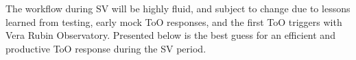 The workflow during SV will be highly fluid, and subject to change due to lessons learned from testing, early mock ToO responses, and the first ToO triggers with Vera Rubin Observatory. Presented below is the best guess for an efficient and productive ToO response during the SV period.